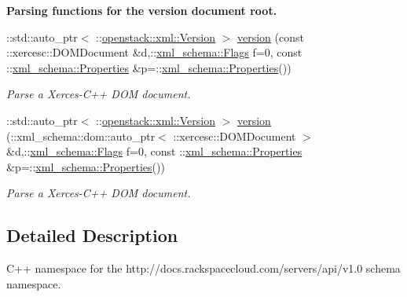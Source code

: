 \begin{Indent}{\bf Parsing functions for the version document root.}
\begin{DoxyCompactItemize}
::std::auto\_\-ptr$<$ ::\hyperlink{classopenstack_1_1xml_1_1Version}{openstack::xml::Version} $>$ \hyperlink{namespaceopenstack_1_1xml_a4934a2b52ce51788c603c0a87fd90fd5}{version} (const ::xercesc::DOMDocument \&d,::\hyperlink{namespacexml__schema_affb4c227cbd9aa7453dd1dc5a1401943}{xml\_\-schema::Flags} f=0, const ::\hyperlink{namespacexml__schema_ad27ce19a7ee1d3b1064092648898f64c}{xml\_\-schema::Properties} \&p=::\hyperlink{namespacexml__schema_ad27ce19a7ee1d3b1064092648898f64c}{xml\_\-schema::Properties}())
\begin{DoxyCompactList}\small\item\em Parse a Xerces-\/C++ DOM document. \item\end{DoxyCompactList}\item 
::std::auto\_\-ptr$<$ ::\hyperlink{classopenstack_1_1xml_1_1Version}{openstack::xml::Version} $>$ \hyperlink{namespaceopenstack_1_1xml_a4ecc9f7ab2a9107da9f5af99989d1a1b}{version} (::xml\_\-schema::dom::auto\_\-ptr$<$ ::xercesc::DOMDocument $>$ \&d,::\hyperlink{namespacexml__schema_affb4c227cbd9aa7453dd1dc5a1401943}{xml\_\-schema::Flags} f=0, const ::\hyperlink{namespacexml__schema_ad27ce19a7ee1d3b1064092648898f64c}{xml\_\-schema::Properties} \&p=::\hyperlink{namespacexml__schema_ad27ce19a7ee1d3b1064092648898f64c}{xml\_\-schema::Properties}())
\begin{DoxyCompactList}\small\item\em Parse a Xerces-\/C++ DOM document. \item\end{DoxyCompactList}\end{DoxyCompactItemize}
\end{Indent}


\subsection{Detailed Description}
C++ namespace for the http://docs.rackspacecloud.com/servers/api/v1.0 schema namespace. 

